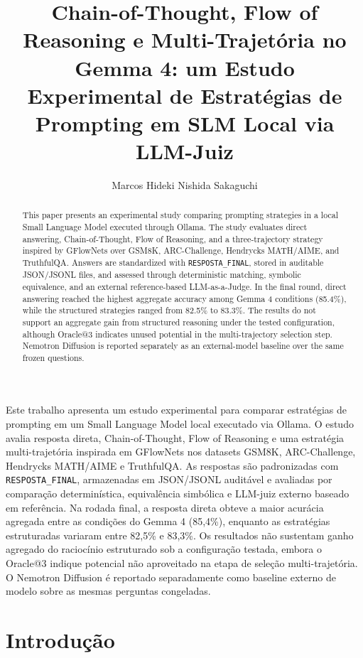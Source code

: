 \documentclass[12pt]{article}
\title{Chain-of-Thought, Flow of Reasoning e Multi-Trajetória no Gemma 4: um Estudo Experimental de Estratégias de Prompting em SLM Local via LLM-Juiz}
\author{Marcos Hideki Nishida Sakaguchi\inst{1}}
\begin{document}
\maketitle

\begin{abstract}
This paper presents an experimental study comparing prompting strategies in a local Small Language Model executed through Ollama. The study evaluates direct answering, Chain-of-Thought, Flow of Reasoning, and a three-trajectory strategy inspired by GFlowNets over GSM8K, ARC-Challenge, Hendrycks MATH/AIME, and TruthfulQA. Answers are standardized with \texttt{RESPOSTA\_FINAL}, stored in auditable JSON/JSONL files, and assessed through deterministic matching, symbolic equivalence, and an external reference-based LLM-as-a-Judge. In the final round, direct answering reached the highest aggregate accuracy among Gemma 4 conditions (85.4\%), while the structured strategies ranged from 82.5\% to 83.3\%. The results do not support an aggregate gain from structured reasoning under the tested configuration, although Oracle@3 indicates unused potential in the multi-trajectory selection step. Nemotron Diffusion is reported separately as an external-model baseline over the same frozen questions.
\end{abstract}

\begin{resumo}
Este trabalho apresenta um estudo experimental para comparar estratégias de prompting em um Small Language Model local executado via Ollama. O estudo avalia resposta direta, Chain-of-Thought, Flow of Reasoning e uma estratégia multi-trajetória inspirada em GFlowNets nos datasets GSM8K, ARC-Challenge, Hendrycks MATH/AIME e TruthfulQA. As respostas são padronizadas com \texttt{RESPOSTA\_FINAL}, armazenadas em JSON/JSONL auditável e avaliadas por comparação determinística, equivalência simbólica e LLM-juiz externo baseado em referência. Na rodada final, a resposta direta obteve a maior acurácia agregada entre as condições do Gemma 4 (85,4\%), enquanto as estratégias estruturadas variaram entre 82,5\% e 83,3\%. Os resultados não sustentam ganho agregado do raciocínio estruturado sob a configuração testada, embora o Oracle@3 indique potencial não aproveitado na etapa de seleção multi-trajetória. O Nemotron Diffusion é reportado separadamente como baseline externo de modelo sobre as mesmas perguntas congeladas.
\end{resumo}

\section{Introdução}
\end{document}
